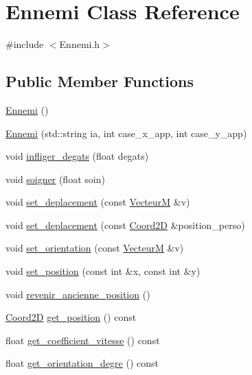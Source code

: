 \hypertarget{classEnnemi}{}\section{Ennemi Class Reference}
\label{classEnnemi}


{\ttfamily \#include $<$Ennemi.\+h$>$}

\subsection*{Public Member Functions}
\begin{DoxyCompactItemize}
\item 
\hyperlink{classEnnemi_a9c5eb7ca82848b97f3dcf262fe625b3a}{Ennemi} ()
\item 
\hyperlink{classEnnemi_a1c5db79ea2fadc4d08654f892fb913b3}{Ennemi} (std\+::string ia, int case\+\_\+x\+\_\+app, int case\+\_\+y\+\_\+app)
\item 
void \hyperlink{classEnnemi_ad49d449d20449273e366be5b89654ebd}{infliger\+\_\+degats} (float degats)
\item 
void \hyperlink{classEnnemi_abcde77d5d90b910b77bf5f66e7c4a534}{soigner} (float soin)
\item 
void \hyperlink{classEnnemi_a554bf929e2b45455ccc9a4b6bba19e88}{set\+\_\+deplacement} (const \hyperlink{classVecteurM}{VecteurM} \&v)
\item 
void \hyperlink{classEnnemi_a202cf059502343eb9b2dd35c7f770dcb}{set\+\_\+deplacement} (const \hyperlink{classCoord2D}{Coord2D} \&position\+\_\+perso)
\item 
void \hyperlink{classEnnemi_ad9b67277a7afb7510b1d72c9b771b52a}{set\+\_\+orientation} (const \hyperlink{classVecteurM}{VecteurM} \&v)
\item 
void \hyperlink{classEnnemi_a2b3b26369645a3c2946f891fcea4ed48}{set\+\_\+position} (const int \&x, const int \&y)
\item 
void \hyperlink{classEnnemi_a7211dfcdacfa996833a611fd4aa9fff1}{revenir\+\_\+ancienne\+\_\+position} ()
\item 
\hyperlink{classCoord2D}{Coord2D} \hyperlink{classEnnemi_a928341b6737ceb7a4469a478b3504fc2}{get\+\_\+position} () const 
\item 
float \hyperlink{classEnnemi_ab2e641b1ee0cd88ecf48024ffb526875}{get\+\_\+coefficient\+\_\+vitesse} () const 
\item 
float \hyperlink{classEnnemi_a7dcf648950daa2d9e3e78258b2b09453}{get\+\_\+orientation\+\_\+degre} () const 
\item 

\end{DoxyCompactItemize}
